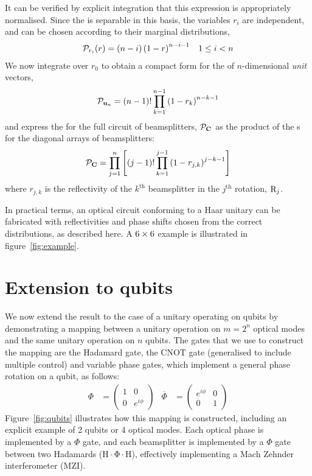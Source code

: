 It can be verified by explicit integration that this expression is appropriately
normalised. Since the \pdf{} is separable in this basis, the variables \( r_i
\) are independent, and can be chosen according to their marginal distributions,
\begin{align}
  \mathcal{P}_{r_{i}} \!\left(r\right) = \left( n-i \right) \left( 1-r \right)^{n-i-1} &&
  1 \leq i < n
\end{align}
We now integrate over \(r_{0}\) to obtain a compact form for the \pdf{} of
\(n\)-dimensional \emph{unit} vectors,
\begin{equation}
  \mathcal{P}_{ \mathbf{u}_n } = \left( n-1 \right)! \prod_{k=1}^{n-1} \left( 1-r_k
  \right)^{n-k-1}
\end{equation}
and express the \pdf{} for the full circuit of beamsplitters,
\(\mathcal{P}_{\mathbf{C}}\) as the product of the \pdf{}s for the diagonal arrays of
beamsplitters:
\begin{equation}
  \mathcal{P}_{\mathbf{C}} = \prod_{j=1}^{n} \left[ \left( j-1 \right)!
  \prod_{k=1}^{j-1} \left( 1-r_{j,k} \right)^{j-k-1} \right]
\end{equation}
where \( r_{j,k} \) is the reflectivity of the \( k^{\text{th}} \) beamsplitter
in the \( j^{\text{th}} \) rotation, \( \mathrm{R}_j \).

In practical terms, an optical circuit conforming to a Haar unitary can be
fabricated with reflectivities and phase shifts chosen from the correct
distributions, as described here. A \( 6 \times 6 \) example is illustrated in
figure~\ref{fig:example}.

\section{Extension to qubits}
\label{sec:Qubits}
We now extend the result to the case of a unitary operating on qubits by
demonstrating a mapping between a unitary operation on \(m=2^{n}\) optical
modes and the same unitary operation on \(n\) qubits. The gates that we use to
construct the mapping are the Hadamard gate, the CNOT gate (generalised to
include multiple control) and variable phase gates, which implement a general
phase rotation on a qubit, as follows:
\begin{align}
  \Phi &= \begin{pmatrix}
    1 & 0 \\
    0 & e^{i\phi}
  \end{pmatrix} &
  \overline{\Phi} &= \begin{pmatrix}
    e^{i\phi} & 0 \\
    0 & 1
  \end{pmatrix}
\end{align}
Figure~\ref{fig:qubits} illustrates how this mapping is constructed, including
an explicit example of 2 qubits or 4 optical modes. Each optical phase is
implemented by a \(\Phi\) gate, and each beamsplitter is implemented by a
\(\Phi\) gate between two Hadamards (\(\mathrm{H \cdot \Phi \cdot H}\)),
effectively implementing a Mach Zehnder interferometer (MZI).

